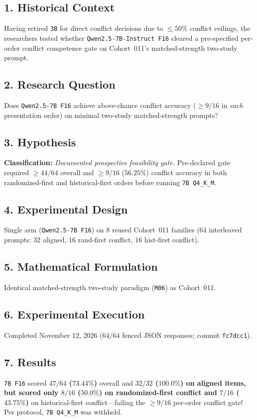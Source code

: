 \subsection*{1. Historical Context}
Having retired \texttt{3B} for direct conflict decisions due to $\le 50\%$ conflict ceilings, the researchers tested whether \texttt{Qwen2.5-7B-Instruct F16} cleared a pre-specified per-order conflict competence gate on Cohort~011's matched-strength two-study prompt.

\subsection*{2. Research Question}
Does \texttt{Qwen2.5-7B F16} achieve above-chance conflict accuracy ($\ge 9/16$ in \emph{each} presentation order) on minimal two-study matched-strength prompts?

\subsection*{3. Hypothesis}
\textbf{Classification:} \emph{Documented prospective feasibility gate.} Pre-declared gate required $\ge 44/64$ overall and $\ge 9/16$ ($56.25\%$) conflict accuracy in both randomized-first and historical-first orders before running \texttt{7B Q4\_K\_M}.

\subsection*{4. Experimental Design}
Single arm (\texttt{Qwen2.5-7B F16}) on $8$ reused Cohort~011 families ($64$ interleaved prompts: $32$ aligned, $16$ rand-first conflict, $16$ hist-first conflict).

\subsection*{5. Mathematical Formulation}
Identical matched-strength two-study paradigm (\texttt{M06}) as Cohort~011.

\subsection*{6. Experimental Execution}
Completed November 12, 2026 ($64/64$ fenced JSON responses; commit \texttt{fc7dcc1}).

\subsection*{7. Results}
\texttt{7B F16} scored \textbf{$47/64$ ($73.44\%$)} overall and \textbf{$32/32$ ($100.0\%$)\textbf{ on aligned items, but scored only }$8/16$ ($50.0\%$)\textbf{ on randomized-first conflict and }$7/16$ ($43.75\%$)} on historical-first conflict---failing the $\ge 9/16$ per-order conflict gate! Per protocol, \texttt{7B Q4\_K\_M} was withheld.

